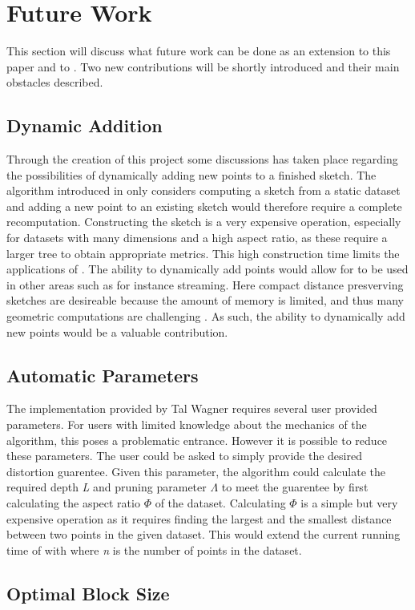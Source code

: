 \section{Future Work}
\label{futurework}
This section will discuss what future work can be done as an extension to this paper and to \cite{wagner17}. Two new contributions will be shortly introduced and their main obstacles described. 

\subsection{Dynamic Addition}
Through the creation of this project some discussions has taken place regarding the possibilities of dynamically adding new points to a finished sketch. The algorithm introduced in \cite{wagner17} only considers computing a sketch from a static dataset and adding a new point to an existing sketch would therefore require a complete recomputation. Constructing the sketch is a very expensive operation, especially for datasets with many dimensions and a high aspect ratio, as these require a larger tree to obtain appropriate metrics. This high construction time limits the applications of \qs{}. The ability to dynamically add points would allow for \qs{} to be used in other areas such as for instance streaming. Here compact distance presverving sketches are desireable because the amount of memory is limited, and thus many geometric computations are  challenging \cite{ShanM}. As such, the ability to dynamically add new points would be a valuable contribution. 

\subsection{Automatic Parameters}
The implementation provided by Tal Wagner requires several user provided parameters. For users with limited knowledge about the mechanics of the algorithm, this poses a problematic entrance. However it is possible to reduce these parameters. The user could be asked to simply provide the desired distortion guarentee. Given this parameter, the algorithm could calculate the required depth \textit{L} and pruning parameter $\Lambda$ to meet the guarentee by first calculating the aspect ratio $\Phi$ of the dataset. Calculating $\Phi$ is a simple but very expensive operation as it requires finding the largest and the smallest distance between two points in the given dataset. This would extend the current running time of \qs{} with  where \textit{n} is the number of points in the dataset. 

\subsection{Optimal Block Size}